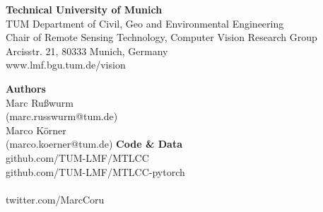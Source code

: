 \documentclass[a0]{tumposter}
\begin{document}
\begin{footer}
	\begin{multicols}{2}
		\textbf{Technical University of Munich}\\
		TUM Department of Civil, Geo and Environmental Engineering \\
		Chair of Remote Sensing Technology, Computer Vision Research Group \\
		Arcisstr. 21, 80333 Munich, Germany \\
		www.lmf.bgu.tum.de/vision
		\vfill\columnbreak
		\begin{multicols}{2}
			\textbf{Authors} \\
			Marc Rußwurm \\ (marc.russwurm@tum.de) \\
			Marco Körner \\ (marco.koerner@tum.de)
			\vfill
			\columnbreak
			\textbf{Code \& Data} \\
			github.com/TUM-LMF/MTLCC \\
			github.com/TUM-LMF/MTLCC-pytorch \\
			\\
			twitter.com/MarcCoru
			\vfill
			\fancywhitespace		
		\end{multicols}
		
	\end{multicols}
\end{footer}
\end{document}
